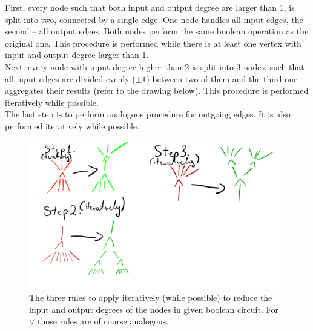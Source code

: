 First, every node such that both input and output degree are larger than 1, is split into two, connected by a single edge.
One node handles all input edges, the second -- all output edges. Both nodes perform the same boolean operation as the original
one. This procedure is performed while there is at least one vertex with input and output degree larger than 1.\\
Next, every node with input degree higher than 2 is split into 3 nodes, such that all input edges are divided evenly ($\pm 1$)
between two of them and the third one aggregates their results (refer to the drawing below). This procedure is performed iteratively
while possible.\\
The last step is to perform analogous procedure for outgoing edges. It is also performed iteratively while possible.
\begin{figure}[H]
      \centering
      \caption{
            The three rules to apply iteratively (while possible) to reduce the input and output degrees of
            the nodes in given boolean circuit. For $\lor$ those rules are of course analogous.
      }
      \includegraphics[scale=0.2]{content/graphics/game17.png}
\end{figure}


